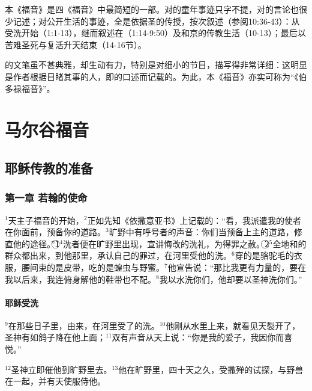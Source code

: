 本《福音》是四《福音》中最简短的一部。对\UL[耶稣]的童年事迹只字不提，对\UL[耶稣]的言论也很少记述；对\UL[耶稣]公开生活的事迹，全是依据圣\UL[伯多禄]的传授，按次叙述（参阅10:36-43）：从\UL[耶稣]受洗开始（1:1-13），继而叙述\UL[耶稣]在\UL[加里肋亚]（1:14-9:50）及\UL[犹太]和\UL[耶]京的传教生活（10-13）；最后以苦难圣死与复活升天结束（14-16节）。

\UL[马尔谷]的文笔虽不甚典雅，却生动有力，特别是对细小的节目，描写得非常详细：这明显是作者根据目睹其事的人，即\UL[伯多禄]的口述而记载的。为此，本《福音》亦实可称为“《伯多禄福音》”。


\chapter{马尔谷福音}


\section{耶稣传教的准备}


\subsection{第一章 若翰的使命}
$^{1}$天主子\UL[耶稣]\UL[基督]福音的开始，$^{2}$正如先知《依撒意亚书》上记载的：“看，我派遣我的使者在你面前，预备你的道路。$^{3}$旷野中有呼号者的声音：你们当预备上主的道路，修直他的途径。”\textcircled{1}$^{4}$洗者\UL[若翰]便在旷野里出现，宣讲悔改的洗礼，为得罪之赦。\textcircled{2}$^{5}$\UL[犹太]全地和\UL[耶路撒冷]的群众都出来，到他那里，承认自己的罪过，在\UL[约但]河里受他的洗。$^{6}$\UL[若翰]穿的是骆驼毛的衣服，腰间束的是皮带，吃的是蝗虫与野蜜。$^{7}$他宣告说：“那比我更有力量的，要在我以后来，我连俯身解他的鞋带也不配。$^{8}$我以水洗你们，他却要以圣神洗你们。”


\subsubsection{耶稣受洗}
$^{9}$在那些日子里，\UL[耶稣]由\UL[加里肋亚]\UL[纳匝肋]来，在\UL[约但]河里受了\UL[若翰]的洗。$^{10}$他刚从水里上来，就看见天裂开了，圣神有如鸽子降在他上面；$^{11}$双有声音从天上说：“你是我的爱子，我因你而喜悦。”

$^{12}$圣神立即催他到旷野里去。$^{13}$他在旷野里，四十天之久，受撒殚的试探，与野兽在一起，并有天使服侍他。


